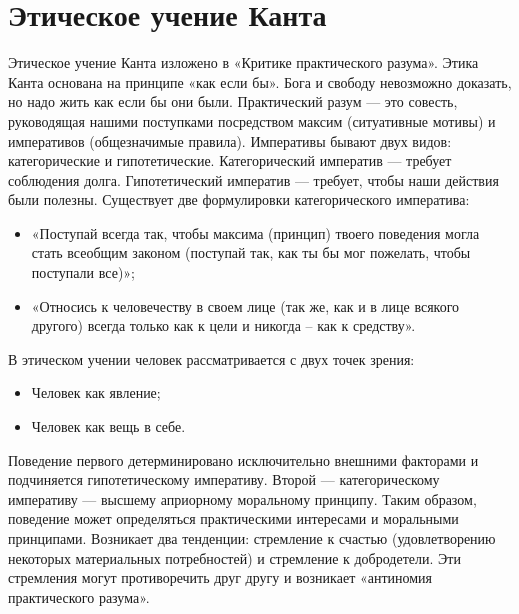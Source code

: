 \documentclass[12pt]{article}
\begin{document}
\section{Этическое учение Канта}
Этическое учение Канта изложено в «Критике практического разума». Этика Канта основана на принципе «как
если бы». Бога и свободу невозможно доказать, но надо жить как если бы они были. Практический разум — это
совесть,  руководящая  нашими  поступками  посредством  максим  (ситуативные  мотивы)  и  императивов
(общезначимые правила). Императивы бывают двух видов: категорические и гипотетические. Категорический
императив — требует соблюдения долга. Гипотетический императив — требует, чтобы наши действия были
полезны. Существует две формулировки категорического императива:
\begin{itemize}
\item «Поступай всегда так, чтобы максима (принцип) твоего поведения могла стать всеобщим законом (поступай
так, как ты бы мог пожелать, чтобы поступали все)»;
\item «Относись к человечеству в своем лице (так же, как и в лице всякого другого) всегда только как к цели и
никогда – как к средству».
\end{itemize}
В этическом учении человек рассматривается с двух точек зрения:
\begin{itemize}
\item Человек как явление;
\item Человек как вещь в себе.
\end{itemize}
Поведение  первого детерминировано исключительно  внешними факторами  и  подчиняется  гипотетическому
императиву. Второй — категорическому императиву — высшему априорному моральному принципу. Таким
образом, поведение может определяться практическими интересами и моральными принципами. Возникает два
тенденции: стремление к счастью (удовлетворению некоторых материальных потребностей) и стремление к
добродетели. Эти стремления могут противоречить друг другу и возникает «антиномия практического разума».

\newpage
\end{document}
